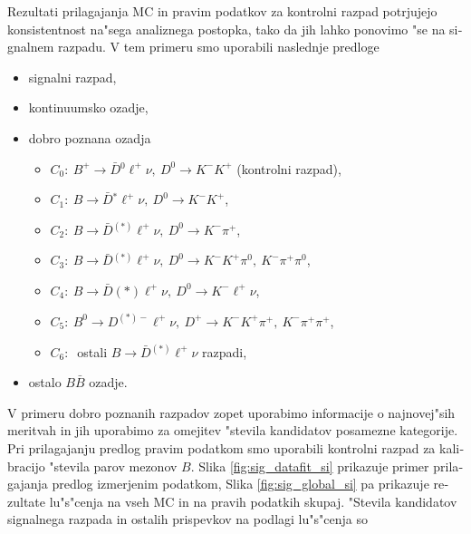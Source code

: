 \begin{otherlanguage}{slovene}
Rezultati prilagajanja MC in pravim podatkov za kontrolni razpad potrjujejo konsistentnost na"sega analiznega postopka, tako da jih lahko ponovimo "se na signalnem razpadu. V tem primeru smo uporabili naslednje predloge
\begin{itemize}
	\item signalni razpad,
	\item kontinuumsko ozadje,
	\item dobro poznana ozadja
	\begin{itemize}
		\item $C_0:~B^+ \to \bar{D} {}^0 \ell^+ \nu,~D^0 \to K^-K^+$ (kontrolni razpad),
		\item $C_1:~B \to \bar{D} {}^* \ell^+ \nu,~D^0 \to K^-K^+$,
		\item $C_2:~B \to \bar{D} {}^{(*)} \ell^+ \nu,~D^0 \to K^-\pi^+$,
		\item $C_3:~B \to \bar{D} {}^{(*)} \ell^+ \nu,~D^0 \to K^-K^+\pi^0,~K^-\pi^+\pi^0$,
		\item $C_4:~B \to \bar{D} {}{(*)} \ell^+ \nu,~D^0 \to K^-\ell^+\nu$,
		\item $C_5:~B^0 \to D^{(*)-} \ell^+ \nu,~D^+ \to K^-K^+\pi^+,~K^-\pi^+\pi^+$,
		\item $C_6:~$ ostali $B \to \bar D {}^{(*)} \ell^+ \nu$ razpadi,
	\end{itemize}
	\item ostalo $B \bar B$ ozadje.
\end{itemize}
V primeru dobro poznanih razpadov zopet uporabimo informacije o najnovej"sih meritvah in jih uporabimo za omejitev "stevila kandidatov posamezne kategorije. Pri prilagajanju predlog pravim podatkom smo uporabili kontrolni razpad za kalibracijo "stevila parov mezonov $B$. Slika \ref{fig:sig_datafit_si} prikazuje primer prilagajanja predlog izmerjenim podatkom, Slika \ref{fig:sig_global_si} pa prikazuje rezultate lu"s"cenja na vseh MC in na pravih podatkih skupaj. "Stevila kandidatov signalnega razpada in ostalih prispevkov na podlagi lu"s"cenja so


\end{otherlanguage}

